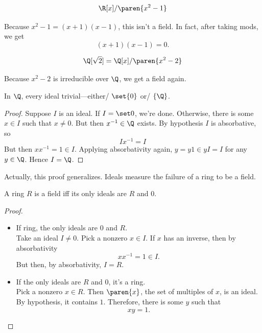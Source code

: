 \documentclass[a5paper]{scrartcl}
\begin{document}
\begin{defn}
  \[
    \R[x]/\paren{x^2-1}
  \]
\end{defn}
Because \(x^2-1= (x+1)(x-1)\), this isn't a field. In fact, after taking mods, we get
\[
  (x+1)(x-1) = 0.
\]

\begin{defn}
  \[
    \Q[\sqrt 2] = \Q[x]/\paren{x^2-2}
  \]
\end{defn}
Because \(x^2-2\) is irreducible over \(\Q\), we get a field again.

\begin{theorem}
  In \(\Q\), every ideal trivial---either\eit/ \(\set{0}\) or\eit/ \(\{\Q\}\).
\end{theorem}
\begin{proof}
  Suppose \(I\) is an ideal. If \(I=\set 0\), we're done. Otherwise, there is some \(x\in I\) such that \(x\neq 0\). But then \(x^{-1}\in \Q\) exists. By hypothesis \(I\) is absorbative, so
  \[
    Ix^{-1} =I
  \]
  But then \(xx^{-1}=1\in I\). Applying absorbativity again, \(y=y1 \in yI = I\) for any \(y\in \Q\). Hence \(I=\Q\).
\end{proof}
Actually, this proof generalizes.
Ideals measure the failure of a ring to be a field.
\begin{theorem}
  A ring \(R\) is a field iff its only ideals are \(R\) and \(0\).
\end{theorem}
\begin{proof}
  \begin{itemize}
    \item If ring, the only ideals are \(0\) and \(R\).\\
          Take an ideal \(I\neq 0\). Pick a nonzero \(x\in I\). If \(x\) has an inverse, then by absorbativity
          \[
          xx^{-1} = 1 \in I.
          \]
          But then, by absorbativity, \(I=R\).
    \item If the only ideals are \(R\) and \(0\), it's a ring.  \\
          Pick a nonzero \(x\in R\). Then \(\paren{x}\), the set of multiples of \(x\), is an ideal. By hypothesis, it contains \(1\). Therefore, there is some \(y\) such that
          \[
          xy =1.
          \]
  \end{itemize}
\end{proof}
\end{document}
